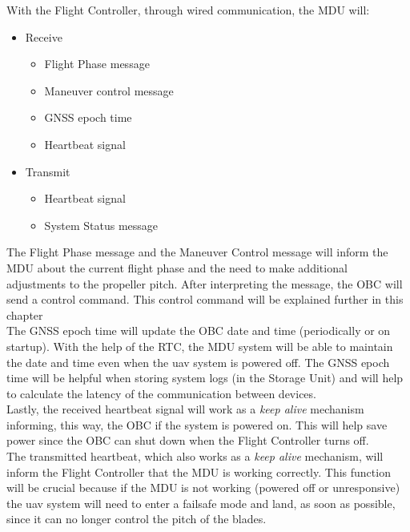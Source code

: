With the Flight Controller, through wired communication, the MDU will:
\begin{itemize}
    \item Receive
          \begin{itemize}
              \item Flight Phase message
              \item Maneuver control message
              \item \gls{GNSS} epoch time
              \item Heartbeat signal
          \end{itemize}
    \item Transmit
          \begin{itemize}
              \item Heartbeat signal
              \item System Status message
          \end{itemize}
\end{itemize}

The Flight Phase message and the Maneuver Control message will inform the MDU about the current flight phase and the need to make additional adjustments to the propeller pitch.
After interpreting the message, the \gls{OBC} will send a control command. This control command will be explained further in this chapter\\

The \gls{GNSS} epoch time will update the \gls{OBC} date and time (periodically or on startup). With the help of the \gls{RTC}, the MDU system will be able to maintain the date and time even when the \gls{uav} system is powered off.
The \gls{GNSS} epoch time will be helpful when storing system logs (in the Storage Unit) and will help to calculate the latency of the communication between devices.\\

Lastly, the received heartbeat signal will work as a \textit{keep alive} mechanism informing, this way, the \gls{OBC} if the system is powered on.
This will help save power since the \gls{OBC} can shut down when the Flight Controller turns off.\\

The transmitted heartbeat, which also works as a \textit{keep alive} mechanism, will inform the Flight Controller that the MDU is working correctly.
This function will be crucial because if the MDU is not working (powered off or unresponsive) the \gls{uav} system will need to enter a failsafe mode and land, as soon as possible, since it can no longer control the pitch of the blades.\\


